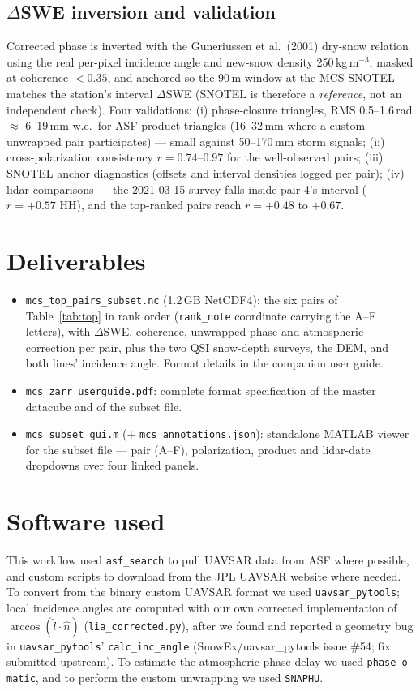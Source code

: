 \documentclass[11pt]{article}
\begin{document}
\subsection{$\Delta$SWE inversion and validation}
Corrected phase is inverted with the Guneriussen et al.\ (2001) dry-snow relation using
the real per-pixel incidence angle and new-snow density 250\,kg\,m$^{-3}$, masked at
coherence $< 0.35$, and anchored so the 90\,m window at the MCS SNOTEL matches the
station's interval $\Delta$SWE (SNOTEL is therefore a \emph{reference}, not an
independent check). Four validations: (i) phase-closure triangles, RMS 0.5--1.6\,rad
$\approx$ 6--19\,mm w.e.\ for ASF-product triangles (16--32\,mm where a custom-unwrapped
pair participates) --- small against 50--170\,mm storm signals; (ii) cross-polarization
consistency $r = 0.74$--$0.97$ for the well-observed pairs; (iii) SNOTEL anchor
diagnostics (offsets and interval densities logged per pair); (iv) lidar comparisons ---
the 2021-03-15 survey falls inside pair 4's interval ($r = +0.57$ HH), and the top-ranked
pairs reach $r = +0.48$ to $+0.67$.

\section{Deliverables}

\begin{itemize}
\item \texttt{mcs\_top\_pairs\_subset.nc} (1.2\,GB NetCDF4): the six pairs of
      Table~\ref{tab:top} in rank order (\texttt{rank\_note} coordinate carrying the
      A--F letters), with
      $\Delta$SWE, coherence, unwrapped phase and atmospheric correction per pair, plus
      the two QSI snow-depth surveys, the DEM, and both lines' incidence angle. Format
      details in the companion user guide.
\item \texttt{mcs\_zarr\_userguide.pdf}: complete format specification of the master
      datacube and of the subset file.
\item \texttt{mcs\_subset\_gui.m} (+ \texttt{mcs\_annotations.json}): standalone
      MATLAB viewer for the subset file --- pair (A--F), polarization, product and
      lidar-date dropdowns over four linked panels.
\end{itemize}

\section{Software used}
This workflow used \texttt{asf\_search} to pull UAVSAR data from ASF where possible, and custom scripts to download from the JPL UAVSAR website where needed.  To convert from the binary custom UAVSAR format we used \texttt{uavsar\_pytools}; local incidence angles are computed with our own corrected implementation of $\arccos(\hat{l}\cdot\hat{n})$ (\texttt{lia\_corrected.py}), after we found and reported a geometry bug in \texttt{uavsar\_pytools}' \texttt{calc\_inc\_angle} (SnowEx/uavsar\_pytools issue \#54; fix submitted upstream).  To estimate the atmospheric phase delay we used \texttt{phase-o-matic}, and to perform the custom unwrapping we used \texttt{SNAPHU}.
\end{document}
